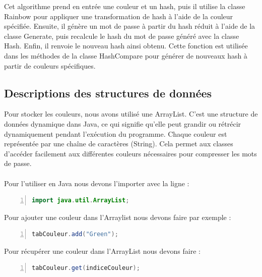 \documentclass[a4paper,12pt]{article}
\begin{document}
Cet algorithme prend en entrée une couleur et un hash, puis il utilise la classe Rainbow pour appliquer une transformation de hash à l'aide de la couleur spécifiée. Ensuite, il génère un mot de passe à partir du hash réduit à l'aide de la classe Generate, puis recalcule le hash du mot de passe généré avec la classe Hash. Enfin, il renvoie le nouveau hash ainsi obtenu. Cette fonction est utilisée dans les méthodes de la classe HashCompare pour générer de nouveaux hash à partir de couleurs spécifiques.


\subsection{Descriptions des structures de données}
Pour stocker les couleurs, nous avons utilisé une ArrayList. C'est une structure de données dynamique dans Java, ce qui signifie qu'elle peut grandir ou rétrécir dynamiquement pendant l'exécution du programme. Chaque couleur est représentée par une chaîne de caractères (String). Cela permet aux classes d'accéder facilement aux différentes couleurs nécessaires pour compresser les mots de passe.\\\\Pour l'utiliser en Java nous devons l'importer avec la ligne : \\
\begin{lstlisting}[language=Java, numbers=left, basicstyle=\ttfamily\footnotesize, keywordstyle=\color{blue}\ttfamily, stringstyle=\color{red}\ttfamily, commentstyle=\color{green}\ttfamily,
numberstyle=\tiny, frame=single, linewidth=6cm]
import java.util.ArrayList;
\end{lstlisting}

Pour ajouter une couleur dans l'Arraylist nous devons faire par exemple :\\
\begin{lstlisting}[language=Java, numbers=left, basicstyle=\ttfamily\footnotesize, keywordstyle=\color{blue}\ttfamily, stringstyle=\color{red}\ttfamily, commentstyle=\color{green}\ttfamily,
numberstyle=\tiny, frame=single, linewidth=5.3cm]
tabCouleur.add("Green");
\end{lstlisting}

Pour récupérer une couleur dans l'ArrayList nous devons faire :\\
\begin{lstlisting}[language=Java, numbers=left, basicstyle=\ttfamily\footnotesize, keywordstyle=\color{blue}\ttfamily, stringstyle=\color{red}\ttfamily, commentstyle=\color{green}\ttfamily,
numberstyle=\tiny, frame=single, linewidth=6.6cm]
tabCouleur.get(indiceCouleur);
\end{lstlisting}
\end{document}
